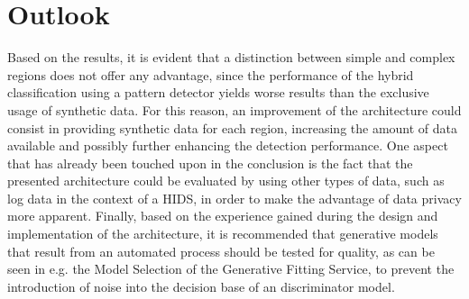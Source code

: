 \documentclass[../../main.tex]{subfiles}
\begin{document}
\section{Outlook}\label{sec:outlook}

Based on the results, it is evident that a distinction between simple and complex regions does not offer any advantage, since the performance of the hybrid classification using a pattern detector yields worse results than the exclusive usage of synthetic data. For this reason, an improvement of the architecture could consist in providing synthetic data for each region, increasing the amount of data available and possibly further enhancing the detection performance. One aspect that has already been touched upon in the conclusion is the fact that the presented architecture could be evaluated by using other types of data, such as log data in the context of a HIDS, in order to make the advantage of data privacy more apparent. Finally, based on the experience gained during the design and implementation of the architecture, it is recommended that generative models that result from an automated process should be tested for quality, as can be seen in e.g. the Model Selection of the Generative Fitting Service, to prevent the introduction of noise into the decision base of an discriminator model.
\end{document}
